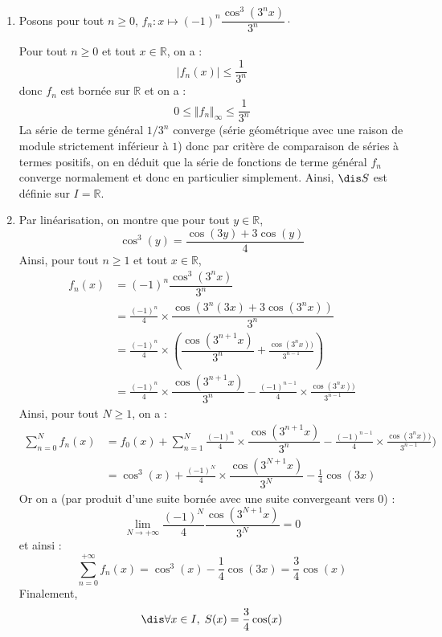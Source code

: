 \documentclass[a4paper,10pt]{report}
\begin{document}
\corr \begin{enumerate}
\item Posons pour tout $n \geq 0$, $f_n : x \mapsto (-1)^n \dfrac{\cos^3(3^nx)}{3^n} \cdot$

\medskip

\noindent Pour tout $n \geq 0$ et tout $x \in \mathbb{R}$, on a :
$$ \vert f_n(x) \vert \leq \frac{1}{3^n}$$
donc $f_n$ est bornée sur $\mathbb{R}$ et on a :
$$ 0 \leq \Vert f_n \Vert_{\infty} \leq \frac{1}{3^n}$$
La série de terme général $1/3^n$ converge (série géométrique avec une raison de module strictement inférieur à $1$) donc par critère de comparaison de séries à termes positifs, on en déduit que la série de fonctions de terme général $f_n$ converge normalement et donc en particulier simplement. Ainsi, $\dis S$ est définie sur $I = \mathbb{R}$.
\item Par linéarisation, on montre que pour tout $y \in \mathbb{R}$,
$$ \cos^3(y) = \frac{\cos(3y)+3\cos(y)}{4}$$
Ainsi, pour tout $n \geq 1$ et tout $x \in \mathbb{R}$,
\begin{align*}
f_n(x)& = (-1)^n \dfrac{\cos^3(3^nx)}{3^n} \\
& = \frac{(-1)^n}{4} \times  \dfrac{\cos(3^n(3x)+3\cos(3^nx))}{3^n}  \\
& = \frac{(-1)^n}{4} \times  \left(\dfrac{\cos(3^{n+1} x)}{3^n}+\frac{\cos(3^nx))}{3^{n-1}} \right) \\
& = \frac{(-1)^n}{4} \times\dfrac{\cos(3^{n+1} x)}{3^n}- \frac{(-1)^{n-1}}{4} \times\frac{\cos(3^nx))}{3^{n-1}} 
\end{align*}
Ainsi, pour tout $N \geq 1$, on a :
\begin{align*}
\sum_{n=0}^{N} f_n(x) & = f_0(x) + \sum_{n=1}^{N} \frac{(-1)^n}{4} \times\dfrac{\cos(3^{n+1} x)}{3^n}- \frac{(-1)^{n-1}}{4} \times\frac{\cos(3^nx))}{3^{n-1}})  \\
& = \cos^3(x) + \frac{(-1)^N}{4} \times\dfrac{\cos(3^{N+1} x)}{3^N} - \frac{1}{4} \cos(3x)     
\end{align*}
Or on a (par produit d'une suite bornée avec une suite convergeant vers $0$) :
$$ \lim_{N \rightarrow + \infty} \frac{(-1)^N}{4} \dfrac{\cos(3^{N+1} x)}{3^N} = 0$$
et ainsi :
$$ \sum_{n=0}^{+\infty} f_n(x)  = \cos^3(x) - \frac{1}{4} \cos(3x) = \frac{3}{4} \cos(x)$$
Finalement,
$$\dis \forall x \in I, \; S(x)= \dfrac{3}{4}\cos(x)$$
\end{enumerate}

\medskip
\end{document}
